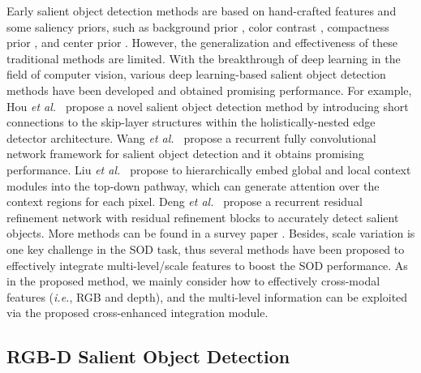 \documentclass[10pt,twocolumn,letterpaper]{article}
\def\ie{\emph{i.e.}}
\def\etal{{\em et al.~}}
\begin{document}
Early salient object detection methods are based on hand-crafted features and some saliency priors, such as background prior \cite{zhu2014saliency}, color contrast \cite{achanta2009frequency}, compactness prior \cite{zhou2015salient}, and center prior \cite{jiang2013submodular}. However, the generalization and effectiveness of these traditional methods are limited. With the breakthrough of deep learning in the field of computer vision, various deep learning-based salient object detection methods have been developed and obtained promising performance. For example, Hou \etal \cite{hou2017deeply} propose a novel salient object detection method by introducing short connections to the skip-layer structures within the holistically-nested edge detector architecture. Wang \etal \cite{wang2018salient} propose a recurrent fully convolutional network framework for salient object detection and it obtains promising performance. Liu \etal \cite{liu2018picanet} propose to hierarchically embed global and local context modules into the top-down pathway, which can generate attention over the context regions for each pixel. Deng \etal \cite{deng2018r3net} propose a recurrent residual refinement network with residual refinement blocks to accurately detect salient objects. More methods can be found in a survey paper \cite{wang2021salient}. Besides, scale variation is one key challenge in the SOD task, thus several methods have been proposed to effectively integrate multi-level/scale features \cite{wang2017edge,zhang2017amulet,zhang2018bi,pang2020multi} to boost the SOD performance. As in the proposed method, we mainly consider how to effectively cross-modal features (\ie, RGB and depth), and the multi-level information can be exploited via the proposed cross-enhanced integration module.



\subsection{RGB-D Salient Object Detection}
\end{document}
